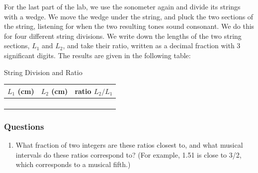 \documentclass[11pt]{NSF}
\def\ben{\begin{enumerate}}
\def\een{\end{enumerate}}
\def\i{\item{}}
\begin{document}
For the last part of the lab, we use the sonometer again and 
divide its strings with a wedge.
We move the wedge under the string, and pluck the two sections 
of the string, listening for when the two resulting tones sound consonant.
We do this for four different string divisions.
We write down the lengths of the two string sections, $L_1$ and 
$L_2$, and take their ratio, written as a decimal fraction with 
3 significant digits.
The results are given in the following table:
%
\begin{table}[h!btp]
\begin{center}
String Division and Ratio\\
\begin{tabular}{| c | c | c | }
\hline
$L_1$ (cm) & $L_2$ (cm) & ratio $L_2/L_1$ \\
\hline
 &  &  \\
\hline
 &  &  \\
\hline
 &  &  \\
\hline
 &  &  \\
\hline
\end{tabular}
\label{t:4}
\end{center}
\end{table}
%

\subsubsection*{Questions}
%
\ben
\i What fraction of two integers are these ratios closest to,
and what musical intervals do these ratios correspond to?
(For example, 1.51 is close to 3/2, which corresponds to a musical 
fifth.)

\een
\end{document}
